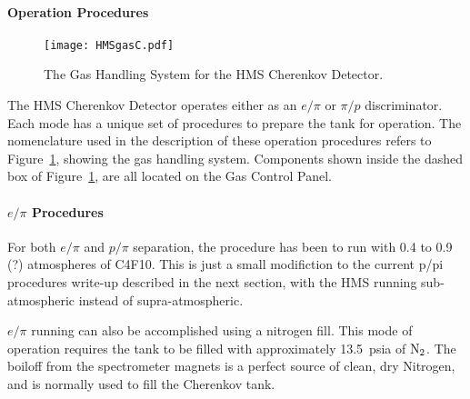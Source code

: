 {\paragraph{Operation Procedures}

\begin{figure}
\texttt{[image: HMSgasC.pdf]}
\caption{The Gas Handling System for the HMS Cherenkov Detector. \label{fig:gas}}
\end{figure}

The HMS Cherenkov Detector operates either as an $e/\pi$ or $\pi/p$
discriminator. Each mode has a unique set of procedures to prepare the tank
for operation. The nomenclature used in the description of these operation
procedures refers to Figure~\ref{fig:gas}, showing the gas handling system. Components
shown
inside the dashed box of Figure~\ref{fig:gas}, are all located on the Gas Control Panel.

\paragraph{$e/\pi$ Procedures}
For both $e/\pi$ and $p/\pi$ separation, the procedure
has been to run with 0.4 to
0.9 (?) atmospheres of C4F10.  This is just a small modifiction to the
current p/pi procedures write-up described in the next section,
with the HMS running sub-atmospheric instead of supra-atmospheric.

$e/\pi$ running can also be accomplished using a nitrogen fill.
This mode of operation requires the tank to be filled with approximately
13.5~psia of $\rm{N_2}$.  The boiloff from the spectrometer magnets is a
perfect source of clean, dry Nitrogen, and is normally used to fill the
Cherenkov tank.

}
